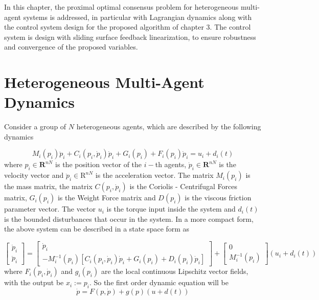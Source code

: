 In this chapter, the proximal optimal consensus problem for heterogeneous multi-agent systems is addressed, in particular with Lagrangian dynamics along with the control system design for the proposed algorithm of chapter 3. The control system is design with sliding surface feedback linearization, to ensure robustness and convergence of the proposed variables.

\section{Heterogeneous Multi-Agent Dynamics }

    Consider a group of $N$ heterogeneous agents, which are described by the following dynamics
    
    \begin{equation}\label{eq:4.1.1}
        M_i(p_i)\ddot{p}_i + C_i(p_i,\dot{p}_i)\dot{p}_i + G_i(p_i) + F_i(p_i)\dot{p}_i = u_i + d_i(t)
    \end{equation}
    where $p_i \in \mathbf{R}^{nN}$ is the position vector of the $i-$th agents, $\dot{p}_i \in \mathbf{R}^{nΝ}$ is the velocity vector and $\ddot{p}_i \in \mathrm{R}^{nΝ}$ is the acceleration vector. The matrix $M_i(p_i)$ is the mass matrix, the matrix $C(p_i,\dot{p}_i)$ is the Coriolis - Centrifugal Forces matrix, $G_i(p_i)$ is the Weight Force matrix and $D(p_i)$ is the viscous friction parameter vector. The vector $u_i$ is the torque input inside the system and $d_i(t)$ is the bounded disturbances that occur in the system. In a more compact form, the above system can be described in a state space form as
    
    \begin{equation}\label{eq:4.1.2}
        \left[\begin{matrix}
            \dot{p}_i \\
            \ddot{p}_i
        \end{matrix}\right] = \left[\begin{matrix}
             \dot{p}_i\\
            -M_i^{-1}(p_i)[C_i(p_i,\dot{p}_i)\dot{p}_i + G_i(p_i) + D_i(p_i)\dot{p}_i] 
        \end{matrix}\right] + \left[\begin{matrix}
            0 \\
            M_i^{-1}(p_i)
        \end{matrix}\right]\left( u_i + d_i(t) \right)
    \end{equation}
    where $F_i(p_i,\dot{p}_i)$ and $g_i(p_i)$ are the local continuous Lipschitz vector fields, with the output be $x_i := p_i$. So the first order dynamic equation will be
    \begin{equation}\label{eq:4.1.3}
        \dot{p} = F(p,\dot{p}) + g(p)(u + d(t))
    \end{equation}
    

